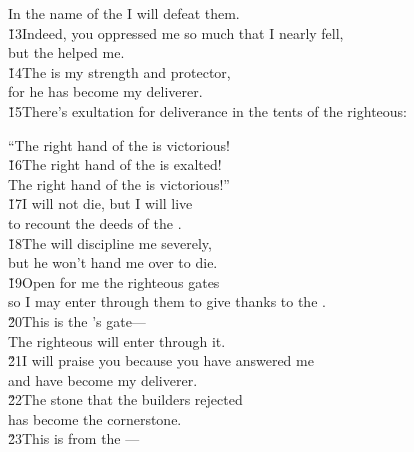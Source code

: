 \begin{poetry}
\poemlll       In the name of the  I will defeat them. \\
\poeml \v{13}Indeed, you oppressed me so much that I nearly fell, \\
\poemll    but the  helped me. \\
\poeml \v{14}The  is my strength and protector, \\
\poemll    for he has become my deliverer. \\
\poeml \v{15}There's exultation for deliverance in the tents of the righteous:
\end{poetry}

\begin{poetry}
\poeml ``The right hand of the  is victorious! \\
\poeml \v{16}The right hand of the  is exalted! \\
\poemlll       The right hand of the  is victorious!'' \\
\poeml \v{17}I will not die, but I will live \\
\poemll    to recount the deeds of the . \\
\poeml \v{18}The  will discipline me severely, \\
\poemll    but he won't hand me over to die. \\
\poeml \v{19}Open for me the righteous gates \\
\poemll    so I may enter through them to give thanks to the . \\
\poeml \v{20}This is the 's gate--- \\
\poemll    The righteous will enter through it. \\
\poeml \v{21}I will praise you because you have answered me \\
\poemll    and have become my deliverer. \\
\poeml \v{22}The stone that the builders rejected \\
\poemll    has become the cornerstone. \\
\poeml \v{23}This is from the --- \\

\end{poetry}
